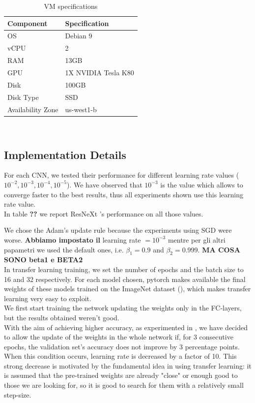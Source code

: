 \documentclass{article}
\begin{document}
\begin{table}
	\centering
	\begin{tabular}{|l|l|} 
		\hline
		\textbf{Component} & \textbf{Specification}  \\ 
		\hline
		OS                 & Debian 9                \\
		vCPU               & 2                       \\
		RAM                & 13GB                    \\
		GPU                & 1X NVIDIA Tesla K80     \\
		Disk               & 100GB                   \\
		Disk Type          & SSD                     \\
		Availability Zone  & us-west1-b              \\
		\hline
	\end{tabular}
\\
\caption{VM specifications}
   	\label{table:specVM}
\end{table}

\subsection{Implementation Details}\label{ImplDet}

For each CNN, we tested their performance for different learning rate values ($10^{-2}, 10^{-3}, 10^{-4}, 10^{-5}$). We have observed that $10^{-3}$ is the value which allows to converge faster to the best results, thus all experiments shown use this learning rate value.\\
In table \textbf{??} we report ResNeXt 's performance on all those values.

We chose the Adam's update rule because the experiments using SGD were worse. \textbf{Abbiamo impostato il }learning rate $= 10^{-3}$ mentre per gli altri papametri we used the default ones, i.e. $\beta_{1}  = 0.9$ and $\beta_{2} = 0.999$.  \textbf{MA COSA SONO beta1 e BETA2}\\

In transfer learning training, we set the number of epochs and the batch size to 16 and 32 respectively.  For each model chosen, pytorch makes available the final weights of these models trained on the ImageNet dataset (\cite{imagenet}), which makes transfer learning very easy to exploit.\\
We first start training the network updating the weights only in the FC-layers, but the results obtained weren't good.\\
With the aim of achieving higher accuracy, as experimented in \cite{ArtistIdCNN406}, we have decided to allow the update of the weights in the whole network if, for 3 consecutive epochs, the validation set's accuracy does not improve by 3 percentage points. When this condition occurs, learning rate is decreased by a factor of 10. This strong decrease is motivated by the fundamental idea in using transfer learning: it is assumed that the pre-trained weights are already "close" or enough good to those we are looking for, so it is good to search for them with a relatively small step-size.
\\
\end{document}
